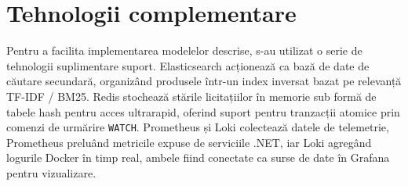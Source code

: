 \section{Tehnologii complementare}

Pentru a facilita implementarea modelelor descrise, s-au utilizat o serie de tehnologii suplimentare suport. Elasticsearch acționează ca bază de date de căutare secundară, organizând produsele într-un index inversat bazat pe relevanță TF-IDF / BM25. Redis stochează stările licitațiilor în memorie sub formă de tabele hash pentru acces ultrarapid, oferind suport pentru tranzacții atomice prin comenzi de urmărire \texttt{WATCH}. Prometheus și Loki colectează datele de telemetrie, Prometheus preluând metricile expuse de serviciile .NET, iar Loki agregând logurile Docker în timp real, ambele fiind conectate ca surse de date în Grafana pentru vizualizare.
